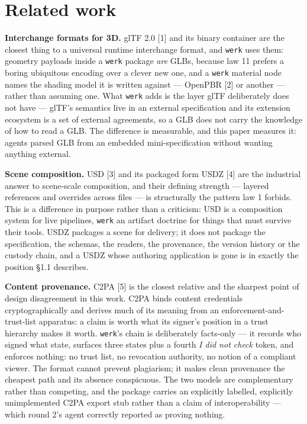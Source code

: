 \documentclass[10pt,twocolumn,letterpaper]{article}
\newcommand{\code}[1]{\texttt{\small #1}}
\begin{document}
\section{Related work}

\textbf{Interchange formats for 3D.} glTF 2.0 [1] and its binary container are the closest thing to a universal runtime interchange format, and \code{werk} uses them: geometry payloads inside a \code{werk} package \emph{are} GLBs, because law 11 prefers a boring ubiquitous encoding over a clever new one, and a \code{werk} material node names the shading model it is written against --- OpenPBR [2] or another --- rather than assuming one. What \code{werk} adds is the layer glTF deliberately does not have --- glTF's semantics live in an external specification and its extension ecosystem is a set of external agreements, so a GLB does not carry the knowledge of how to read a GLB. The difference is measurable, and this paper measures it: agents parsed GLB from an embedded mini-specification without wanting anything external.

\textbf{Scene composition.} USD [3] and its packaged form USDZ [4] are the industrial answer to scene-scale composition, and their defining strength --- layered references and overrides across files --- is structurally the pattern law 1 forbids. This is a difference in purpose rather than a criticism: USD is a composition system for live pipelines, \code{werk} an artifact doctrine for things that must survive their tools. USDZ packages a scene for delivery; it does not package the specification, the schemas, the readers, the provenance, the version history or the custody chain, and a USDZ whose authoring application is gone is in exactly the position \S1.1 describes.

\textbf{Content provenance.} C2PA [5] is the closest relative and the sharpest point of design disagreement in this work. C2PA binds content credentials cryptographically and derives much of its meaning from an enforcement-and-trust-list apparatus: a claim is worth what its signer's position in a trust hierarchy makes it worth. \code{werk}'s chain is deliberately facts-only --- it records who signed what state, surfaces three states plus a fourth \emph{I did not check} token, and enforces nothing: no trust list, no revocation authority, no notion of a compliant viewer. The format cannot prevent plagiarism; it makes clean provenance the cheapest path and its absence conspicuous. The two models are complementary rather than competing, and the package carries an explicitly labelled, explicitly unimplemented C2PA export stub rather than a claim of interoperability --- which round 2's agent correctly reported as proving nothing.
\end{document}
